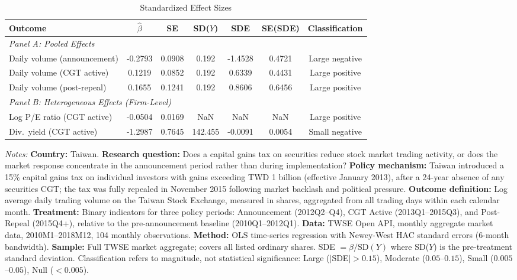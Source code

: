 \begin{table}[htbp]
\centering
\caption{Standardized Effect Sizes}
\label{tab:sde}
\begin{threeparttable}
\small
\begin{tabular}{lcccccc}
\toprule
Outcome & $\hat{\beta}$ & SE & SD($Y$) & SDE & SE(SDE) & Classification \\
\midrule
\multicolumn{7}{l}{\textit{Panel A: Pooled Effects}} \\[3pt]
Daily volume (announcement) & -0.2793 & 0.0908 & 0.192 & -1.4528 & 0.4721 & Large negative \\
Daily volume (CGT active) & 0.1219 & 0.0852 & 0.192 & 0.6339 & 0.4431 & Large positive \\
Daily volume (post-repeal) & 0.1655 & 0.1241 & 0.192 & 0.8606 & 0.6456 & Large positive \\
\midrule
\multicolumn{7}{l}{\textit{Panel B: Heterogeneous Effects (Firm-Level)}} \\[3pt]
Log P/E ratio (CGT active) & -0.0504 & 0.0169 &  NaN &   NaN &   NaN & Large positive \\
Div.~yield (CGT active) & -1.2987 & 0.7645 & 142.455 & -0.0091 & 0.0054 & Small negative \\
\bottomrule
\end{tabular}
\begin{tablenotes}[flushleft]\footnotesize
\item \textit{Notes:} \textbf{Country:} Taiwan. \textbf{Research question:} Does a capital gains tax on securities reduce stock market trading activity, or does the market response concentrate in the announcement period rather than during implementation? \textbf{Policy mechanism:} Taiwan introduced a 15\% capital gains tax on individual investors with gains exceeding TWD 1 billion (effective January 2013), after a 24-year absence of any securities CGT; the tax was fully repealed in November 2015 following market backlash and political pressure. \textbf{Outcome definition:} Log average daily trading volume on the Taiwan Stock Exchange, measured in shares, aggregated from all trading days within each calendar month. \textbf{Treatment:} Binary indicators for three policy periods: Announcement (2012Q2--Q4), CGT Active (2013Q1--2015Q3), and Post-Repeal (2015Q4+), relative to the pre-announcement baseline (2010Q1--2012Q1). \textbf{Data:} TWSE Open API, monthly aggregate market data, 2010M1--2018M12, 104 monthly observations. \textbf{Method:} OLS time-series regression with Newey-West HAC standard errors (6-month bandwidth). \textbf{Sample:} Full TWSE market aggregate; covers all listed ordinary shares. SDE $= \hat{\beta} / \text{SD}(Y)$ where SD($Y$) is the pre-treatment standard deviation. Classification refers to magnitude, not statistical significance: Large ($|$SDE$| > 0.15$), Moderate ($0.05$--$0.15$), Small ($0.005$--$0.05$), Null ($< 0.005$).
\end{tablenotes}
\end{threeparttable}
\end{table}
